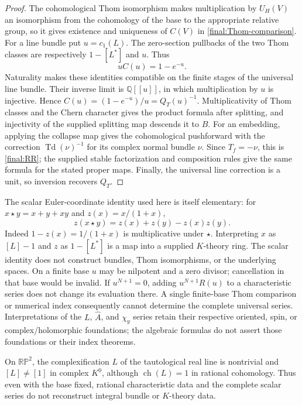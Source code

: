 \begin{proof}
The cohomological Thom isomorphism makes multiplication by $U_H(V)$
an isomorphism from the cohomology of the base to the appropriate
relative group, so it gives existence and uniqueness of $C(V)$ in
\eqref{final:Thom-comparison}.  For a line bundle put $u=c_1(L)$.
The zero-section pullbacks of the two Thom classes are respectively
$1-[L^*]$ and $u$.  Thus
\[
 uC(u)=1-e^{-u}.
\]
Naturality makes these identities compatible on the finite stages
of the universal line bundle.  Their inverse limit is
$\mathbb Q[[u]]$, in which multiplication by $u$ is injective.
Hence $C(u)=(1-e^{-u})/u=Q_T(u)^{-1}$.  Multiplicativity of Thom
classes and the Chern character gives the product formula after
splitting, and injectivity of the supplied splitting map descends
it to $B$.  For an embedding, applying the collapse map gives the
cohomological pushforward with the correction
$\operatorname{Td}(\nu)^{-1}$ for its complex normal bundle $\nu$.
Since $T_f=-\nu$, this is \eqref{final:RR}; the supplied stable
factorization and composition rules give the same formula for the
stated proper maps.  Finally, the universal line correction is a
unit, so inversion recovers $Q_T$.
\end{proof}

The scalar Euler-coordinate identity used here is itself elementary:
for $x\star y=x+y+xy$ and $z(x)=x/(1+x)$,
\[
 z(x\star y)=z(x)+z(y)-z(x)z(y).
\]
Indeed $1-z(x)=1/(1+x)$ is multiplicative under $\star$.
Interpreting $x$ as $[L]-1$ and $z$ as $1-[L^*]$ is a map into a
supplied $K$-theory ring.  The scalar identity does not construct
bundles, Thom isomorphisms, or the underlying spaces.  On a finite
base $u$ may be nilpotent and a zero divisor; cancellation in that
base would be invalid.  If $u^{N+1}=0$, adding $u^{N+1}R(u)$ to a
characteristic series does not change its evaluation there.  A single
finite-base Thom comparison or numerical index consequently cannot
determine the complete universal series.  Interpretations of the
$L$, $\widehat A$, and $\chi_y$ series retain their respective
oriented, spin, or complex/holomorphic foundations; the algebraic
formulas do not assert those foundations or their index theorems.

\begin{proposition}
\label{final:F5}
On $\mathbb{RP}^2$, the complexification $L$ of the tautological real
line is nontrivial and $[L]\ne[1]$ in complex $K^0$, although
$\operatorname{ch}(L)=1$ in rational cohomology.  Thus even with the
base fixed, rational characteristic data and the complete scalar
series do not reconstruct integral bundle or $K$-theory data.
\end{proposition}

